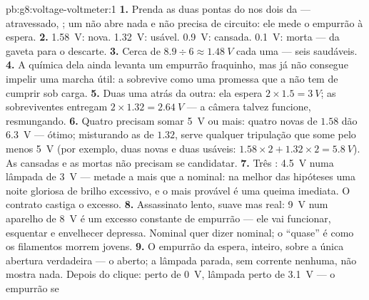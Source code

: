 \begin{solution}{pb:g8:voltage-voltmeter:1}
\textbf{1.} Prenda as duas pontas do  nos dois  da
 --- atravessado, ; um  não abre nada e não
precisa de circuito: ele mede o empurrão à espera.
\textbf{2.} \qty{1.58}{V}: nova. \qty{1.32}{V}: usável.
\qty{0.9}{V}: cansada. \qty{0.1}{V}: morta --- da gaveta para o
descarte.
\textbf{3.} Cerca de $8.9 \div 6 \approx \qty{1.48}{V}$ cada uma ---
seis  saudáveis.
\textbf{4.} A química dela ainda levanta um empurrão fraquinho, mas
já não consegue impelir uma marcha útil: a  sobrevive como uma
promessa que a  não tem  de cumprir sob carga.
\textbf{5.} Duas uma atrás da outra: ela espera
$2 \times 1.5 = \qty{3}{V}$; as sobreviventes entregam
$2 \times 1.32 = \qty{2.64}{V}$ --- a câmera talvez funcione,
resmungando.
\textbf{6.} Quatro  precisam somar \qty{5}{V} ou mais: quatro
novas de $1.58$ dão \qty{6.3}{V} --- ótimo; misturando as de $1.32$,
serve qualquer tripulação que some pelo menos \qty{5}{V} (por exemplo,
duas novas e duas usáveis:
$1.58 \times 2 + 1.32 \times 2 = \qty{5.8}{V}$). As cansadas e as
mortas não precisam se candidatar.
\textbf{7.} Três : \qty{4.5}{V} numa lâmpada de \qty{3}{V} ---
metade a mais que a nominal: na melhor das hipóteses uma noite
gloriosa de brilho excessivo, e o mais provável é uma queima
imediata. O contrato castiga o excesso.
\textbf{8.} Assassinato lento, suave mas real: \qty{9}{V} num
aparelho de \qty{8}{V} é um excesso constante de empurrão --- ele vai
funcionar, esquentar e envelhecer depressa. Nominal quer dizer
nominal; o ``quase'' é como os filamentos morrem jovens.
\textbf{9.} O empurrão da  espera, inteiro, sobre a única
abertura verdadeira --- o  aberto; a lâmpada parada, sem
corrente nenhuma, não mostra nada. Depois do clique: 
perto de \qty{0}{V}, lâmpada perto de \qty{3.1}{V} --- o empurrão se

\end{solution}

